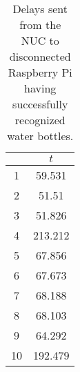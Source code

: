 \begin{appendices}
\begin{table}[H]
	\centering
	\begin{tabular}{c|c}\toprule
		& $t$  \\ \midrule
		1&	59.531\\
		2&	51.51\\
		3&	51.826\\
		4&	213.212\\
		5&	67.856\\
		6&	67.673\\
		7&	68.188\\
		8&	68.103\\
		9&	64.292\\
		10&	192.479\\
		\end{tabular}
	\caption{Delays sent from the NUC to disconnected Raspberry Pi having successfully recognized water bottles.}
	\label{table:DIS3-trdulyd}
\end{table}

\end{appendices}


